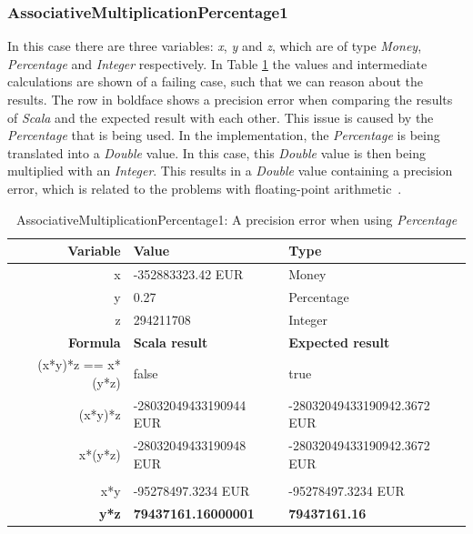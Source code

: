 \subsubsection{AssociativeMultiplicationPercentage1}
In this case there are three variables: \textit{x}, \textit{y} and \textit{z},
which are of type \textit{Money}, \textit{Percentage} and \textit{Integer}
respectively. In Table \ref{ch4_init_check_AssociativeMultiplicationPercentage1}
the values and intermediate calculations are shown of a failing case, such that
we can reason about the results. The row in boldface shows a precision error
when comparing the results of \textit{Scala} and the expected result with each
other. This issue is caused by the \textit{Percentage} that is being used. In
the implementation, the \textit{Percentage} is being translated into a
\textit{Double} value. In this case, this \textit{Double} value is then being
multiplied with an \textit{Integer}. This results in a \textit{Double} value
containing a precision error, which is related to the problems with
floating-point arithmetic~\cite{goldberg1991every}.
\begin{table}[!ht]
\centering
\begin{tabular}{rll}
\hline
\textbf{Variable}  & \textbf{Value}             & \textbf{Type}               \\ \hline
x                  & -352883323.42 EUR          & Money                       \\
y                  & 0.27                       & Percentage                  \\
z                  & 294211708                  & Integer                     \\ \hline
\textbf{Formula}   & \textbf{Scala result}      & \textbf{Expected result}    \\ \hline
(x*y)*z == x*(y*z) & false                      & true                        \\
(x*y)*z            & -28032049433190944 EUR     & -28032049433190942.3672 EUR \\
x*(y*z)            & -28032049433190948 EUR     & -28032049433190942.3672 EUR \\
                   &                            &                             \\
x*y                & -95278497.3234 EUR         & -95278497.3234 EUR          \\
\textbf{y*z}       & \textbf{79437161.16000001} & \textbf{79437161.16}        \\ \hline
\end{tabular}
\caption{AssociativeMultiplicationPercentage1: A precision error when using \textit{Percentage}}
\label{ch4_init_check_AssociativeMultiplicationPercentage1}
\end{table}

